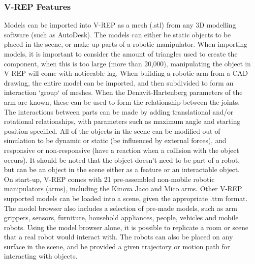 \documentclass[12pt,openany,a4paper]{book}
\begin{document}
\subsubsection{V-REP Features}
Models can be imported into V-REP as a mesh (.stl) from any 3D modelling software (such as AutoDesk). The models can either be static objects to be placed in the scene, or make up parts of a robotic manipulator. When importing models, it is important to consider the amount of triangles used to create the component, when this is too large (more than 20,000), manipulating the object in V-REP will come with noticeable lag. When building a robotic arm from a CAD drawing, the entire model can be imported, and then subdivided to form an interaction `group` of meshes. When the Denavit-Hartenberg parameters of the arm are known, these can be used to form the relationship between the joints. The interactions between parts can be made by adding translational and/or rotational relationships, with parameters such as maximum angle and starting position specified. All of the objects in the scene can be modified out of simulation to be dynamic or static (be influenced by external forces), and responsive or non-responsive (have a reaction when a collision with the object occurs). It should be noted that the object doesn't need to be part of a robot, but can be an object in the scene either as a feature or an interactable object.\\


On start-up, V-REP comes with 21 pre-assembled non-mobile robotic manipulators (arms), including the Kinova Jaco and Mico arms. Other V-REP supported models can be loaded into a scene, given the appropriate .ttm format. The model browser also includes a selection of pre-made models, such as arm grippers, sensors, furniture, household appliances, people, vehicles and mobile robots. Using the model browser alone, it is possible to replicate a room or scene that a real robot would interact with. The robots can also be placed on any surface in the scene, and be provided a given trajectory or motion path for interacting with objects.\\
\end{document}
